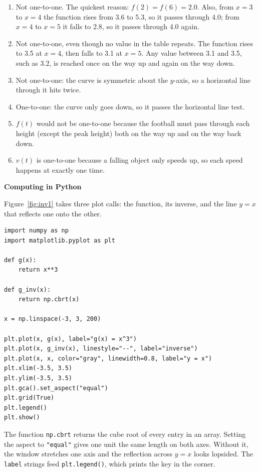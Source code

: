 \begin{Answer}[ref=invfunc1]
  \begin{enumerate}
    \item Not one-to-one. The quickest reason: $f(2) = f(6) = 2.0$. Also,
          from $x=3$ to $x=4$ the function rises from 3.6 to 5.3, so it passes
          through 4.0; from $x=4$ to $x=5$ it falls to 2.8, so it passes
          through 4.0 again.
    \item Not one-to-one, even though no value in the table repeats. The
          function rises to 3.5 at $x=4$, then falls to 3.1 at $x=5$. Any
          value between 3.1 and 3.5, such as 3.2, is reached once on the way
          up and again on the way down.
    \item Not one-to-one: the curve is symmetric about the $y$-axis, so a
          horizontal line through it hits twice.
    \item One-to-one: the curve only goes down, so it passes the horizontal
          line test.
    \item $f(t)$ would not be one-to-one because the football must pass
          through each height (except the peak height) both on the way up and
          on the way back down.
    \item $v(t)$ is one-to-one because a falling object only speeds up, so
          each speed happens at exactly one time.
  \end{enumerate}
\end{Answer}


\textbf{Computing in Python}

Figure~\ref{fig:inv1} takes three plot calls: the function, its inverse,
and the line $y = x$ that reflects one onto the other.

\begin{verbatim}
import numpy as np
import matplotlib.pyplot as plt

def g(x):
    return x**3

def g_inv(x):
    return np.cbrt(x)

x = np.linspace(-3, 3, 200)

plt.plot(x, g(x), label="g(x) = x^3")
plt.plot(x, g_inv(x), linestyle="--", label="inverse")
plt.plot(x, x, color="gray", linewidth=0.8, label="y = x")
plt.xlim(-3.5, 3.5)
plt.ylim(-3.5, 3.5)
plt.gca().set_aspect("equal")
plt.grid(True)
plt.legend()
plt.show()
\end{verbatim}

The function \texttt{np.cbrt} returns the cube root of every
entry in an array. Setting the aspect to \texttt{"equal"} gives
one unit the same length on both axes. Without it, the window stretches one
axis and the reflection across $y = x$ looks lopsided. The
\texttt{label} strings feed \texttt{plt.legend()},
which prints the key in the corner.

